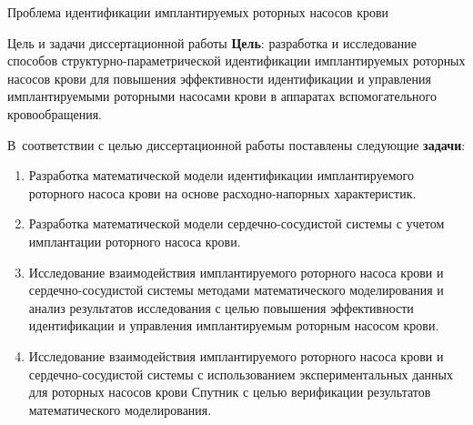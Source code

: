 \documentclass[a4paper, 9pt]{beamer}
\begin{document}
\begin{frame}{Проблема идентификации имплантируемых роторных насосов крови}



\end{frame}


\begin{frame}{Цель и задачи диссертационной работы}
\small
\textbf{Цель}: разработка и исследование способов структурно-параметрической идентификации имплантируемых роторных насосов крови для повышения эффективности идентификации и управления имплантируемыми роторными насосами крови в аппаратах вспомогательного кровообращения.

В~соответствии с целью диссертационной работы поставлены следующие \textbf{задачи}:
\small

\begin{enumerate}
  \item Разработка математической модели идентификации имплантируемого роторного насоса крови на основе расходно-напорных характеристик.
  \item Разработка математической модели сердечно-сосудистой системы с учетом имплантации роторного насоса крови.
  \item Исследование взаимодействия имплантируемого роторного насоса крови и сердечно-сосудистой системы методами математического моделирования и анализ результатов исследования с целью повышения эффективности идентификации и управления имплантируемым роторным насосом крови.
  \item Исследование взаимодействия имплантируемого роторного насоса крови и сердечно-сосудистой системы с использованием экспериментальных данных для роторных насосов крови Спутник с целью верификации результатов математического моделирования.
\end{enumerate}

\end{frame}
\end{document}

